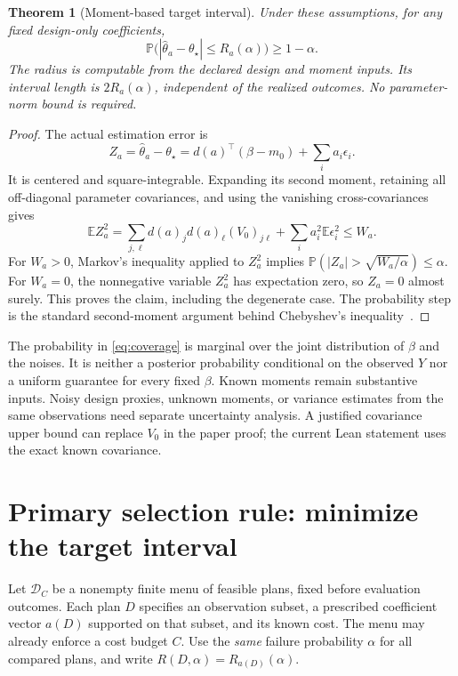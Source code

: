 \documentclass[11pt]{article}
\newtheorem{theorem}{Theorem}
\theoremstyle{remark}
\newcommand{\E}{\mathbb E}
\newcommand{\Prob}{\mathbb P}
\begin{document}
\begin{theorem}[Moment-based target interval]\label{thm:moments}
Under these assumptions, for any fixed design-only coefficients,
\begin{equation}
 \Prob\bigl(|\widehat\theta_a-\theta_\star|\le R_a(\alpha)\bigr)
 \ge1-\alpha.                                                 \label{eq:coverage}
\end{equation}
The radius is computable from the declared design and moment inputs. Its interval length is $2R_a(\alpha)$, independent of the realized outcomes. No parameter-norm bound is required.
\end{theorem}
\begin{proof}
The actual estimation error is
\[
 Z_a=\widehat\theta_a-\theta_\star
     =d(a)^\top(\beta-m_0)+\sum_i a_i\epsilon_i.
\]
It is centered and square-integrable. Expanding its second moment, retaining all off-diagonal parameter covariances, and using the vanishing cross-covariances gives
\[
 \E Z_a^2
 =\sum_{j,\ell}d(a)_jd(a)_\ell(V_0)_{j\ell}
       +\sum_i a_i^2\E\epsilon_i^2
 \le W_a.
\]
For $W_a>0$, Markov's inequality applied to $Z_a^2$ implies
$\Prob(|Z_a|>\sqrt{W_a/\alpha})\le\alpha$. For $W_a=0$, the nonnegative variable $Z_a^2$ has expectation zero, so $Z_a=0$ almost surely. This proves the claim, including the degenerate case. The probability step is the standard second-moment argument behind Chebyshev's inequality~\cite{duchi2023notes}.
\end{proof}

The probability in \eqref{eq:coverage} is marginal over the joint distribution of $\beta$ and the noises. It is neither a posterior probability conditional on the observed $Y$ nor a uniform guarantee for every fixed $\beta$. Known moments remain substantive inputs. Noisy design proxies, unknown moments, or variance estimates from the same observations need separate uncertainty analysis. A justified covariance upper bound can replace $V_0$ in the paper proof; the current Lean statement uses the exact known covariance.

\section{Primary selection rule: minimize the target interval}
\label{sec:finite}
Let $\mathcal D_C$ be a nonempty finite menu of feasible plans, fixed before evaluation outcomes. Each plan $D$ specifies an observation subset, a prescribed coefficient vector $a(D)$ supported on that subset, and its known cost. The menu may already enforce a cost budget $C$. Use the \emph{same} failure probability $\alpha$ for all compared plans, and write $R(D,\alpha)=R_{a(D)}(\alpha)$.
\end{document}
